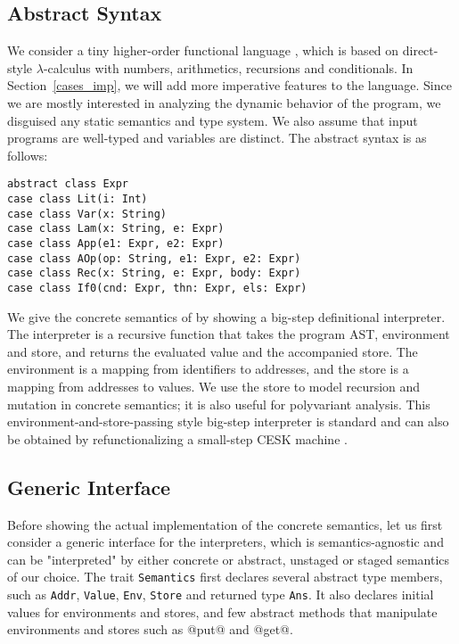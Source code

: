 \subsection{Abstract Syntax} \label{bg_lang}

We consider a tiny higher-order functional language \TLang, which is based on direct-style $\lambda$-calculus
with numbers, arithmetics, recursions and conditionals.
In Section~\ref{cases_imp}, we will add more imperative features to the language.
Since we are mostly interested in analyzing the dynamic behavior of the program, we disguised any static semantics and
type system. We also assume that input programs are well-typed and variables are distinct.
The abstract syntax is as follows:

\begin{lstlisting}
abstract class Expr
case class Lit(i: Int)
case class Var(x: String)
case class Lam(x: String, e: Expr)
case class App(e1: Expr, e2: Expr)
case class AOp(op: String, e1: Expr, e2: Expr)
case class Rec(x: String, e: Expr, body: Expr)
case class If0(cnd: Expr, thn: Expr, els: Expr)
\end{lstlisting}

We give the concrete semantics of \TLang by showing a big-step definitional interpreter.
The interpreter is a recursive function that takes the program AST, environment and store, and returns 
the evaluated value and the accompanied store. The environment is a mapping from identifiers to addresses,
and the store is a mapping from addresses to values. 
We use the store to model recursion and mutation in concrete semantics; it is also useful for polyvariant analysis.
This environment-and-store-passing style big-step interpreter is standard and can also be obtained by 
refunctionalizing \cite{DBLP:conf/ppdp/AgerBDM03, Wei:2018:RAA:3243631.3236800} a small-step CESK 
machine \cite{DBLP:conf/popl/FelleisenF87}.

\subsection{Generic Interface} 
Before showing the actual implementation of the concrete semantics, let us first consider
a generic interface for the interpreters, which is semantics-agnostic and can be 
"interpreted" by either concrete or abstract, unstaged or staged semantics of our choice.
The trait \texttt{Semantics} first declares several abstract type members, such as \texttt{Addr},
\texttt{Value}, \texttt{Env}, \texttt{Store} and returned type \texttt{Ans}. 
It also declares initial values for environments and stores, and few abstract methods that 
manipulate environments and stores such as @put@ and @get@.

